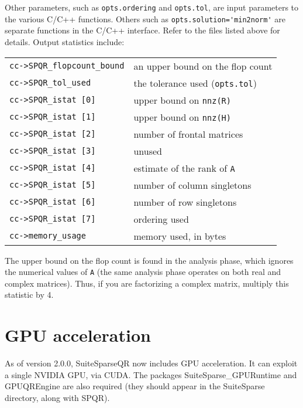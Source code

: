 \documentclass[12pt]{article}
\begin{document}
Other parameters, such as \verb'opts.ordering' and \verb'opts.tol',
are input parameters to the various C/C++ functions.  Others such as
\verb"opts.solution='min2norm'" are separate functions in the C/C++
interface.  Refer to the files listed above for details.
Output statistics include:

\vspace{0.1in}
{\footnotesize
\begin{tabular}{|ll|}
\hline
\verb'cc->SPQR_flopcount_bound' & an upper bound on the flop count \\
\verb'cc->SPQR_tol_used' & the tolerance used (\verb'opts.tol') \\
\hline
\verb'cc->SPQR_istat [0]' & upper bound on \verb'nnz(R)' \\
\verb'cc->SPQR_istat [1]' & upper bound on \verb'nnz(H)' \\
\verb'cc->SPQR_istat [2]' & number of frontal matrices \\
\verb'cc->SPQR_istat [3]' & unused \\
\verb'cc->SPQR_istat [4]' & estimate of the rank of \verb'A' \\
\verb'cc->SPQR_istat [5]' & number of column singletons \\
\verb'cc->SPQR_istat [6]' & number of row singletons \\
\verb'cc->SPQR_istat [7]' & ordering used \\
\hline
\verb'cc->memory_usage'   & memory used, in bytes \\
\hline
\end{tabular}
}
\vspace{0.1in}

The upper bound on the flop count is found in the analysis phase, which ignores
the numerical values of \verb'A' (the same analysis phase operates on both real
and complex matrices).  Thus, if you are factorizing a complex matrix, multiply
this statistic by 4.

\section{GPU acceleration}
\label{GPU}

As of version 2.0.0, SuiteSparseQR now includes GPU acceleration.
It can exploit a single NVIDIA GPU, via CUDA.
The packages SuiteSparse\_GPURuntime and
GPUQREngine are also required (they should appear in the SuiteSparse
directory, along with SPQR).
\end{document}
